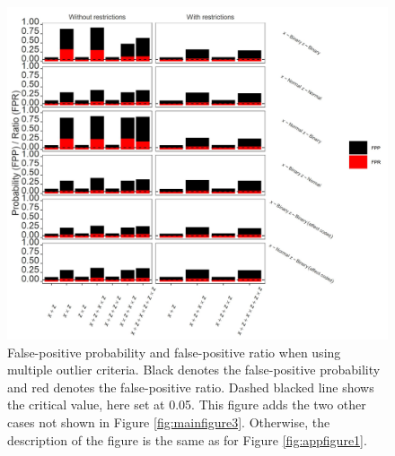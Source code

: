 \begin{figure}[ht!]
\includegraphics[width=1\textwidth]{R/Analysis/Result/Figures/Figure1BSI.jpeg}
\centering
\caption{False-positive probability and false-positive ratio when using multiple outlier criteria. Black denotes the false-positive probability and red denotes the false-positive ratio. Dashed blacked line shows the critical value, here set at 0.05. This figure adds the two other cases not shown in Figure \ref{fig:mainfigure3}. Otherwise, the description of the figure is the same as for Figure \ref{fig:appfigure1}.
}
\label{fig:appfigure4}
\end{figure}


